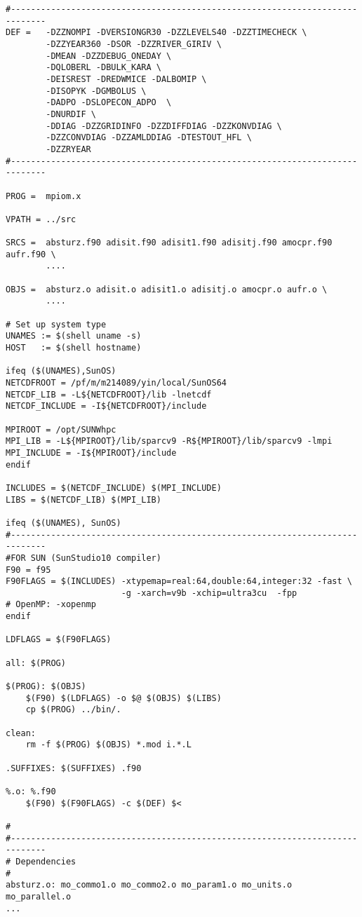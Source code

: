 \begin{footnotesize}
\begin{verbatim}
#-----------------------------------------------------------------------------
DEF =   -DZZNOMPI -DVERSIONGR30 -DZZLEVELS40 -DZZTIMECHECK \
        -DZZYEAR360 -DSOR -DZZRIVER_GIRIV \
        -DMEAN -DZZDEBUG_ONEDAY \
        -DQLOBERL -DBULK_KARA \
        -DEISREST -DREDWMICE -DALBOMIP \
        -DISOPYK -DGMBOLUS \
        -DADPO -DSLOPECON_ADPO  \
        -DNURDIF \
        -DDIAG -DZZGRIDINFO -DZZDIFFDIAG -DZZKONVDIAG \
        -DZZCONVDIAG -DZZAMLDDIAG -DTESTOUT_HFL \
        -DZZRYEAR
#-----------------------------------------------------------------------------

PROG =	mpiom.x

VPATH = ../src

SRCS =	absturz.f90 adisit.f90 adisit1.f90 adisitj.f90 amocpr.f90 aufr.f90 \
        ....

OBJS =	absturz.o adisit.o adisit1.o adisitj.o amocpr.o aufr.o \
        ....

# Set up system type
UNAMES := $(shell uname -s)
HOST   := $(shell hostname)

ifeq ($(UNAMES),SunOS)
NETCDFROOT = /pf/m/m214089/yin/local/SunOS64
NETCDF_LIB = -L${NETCDFROOT}/lib -lnetcdf
NETCDF_INCLUDE = -I${NETCDFROOT}/include

MPIROOT = /opt/SUNWhpc
MPI_LIB = -L${MPIROOT}/lib/sparcv9 -R${MPIROOT}/lib/sparcv9 -lmpi
MPI_INCLUDE = -I${MPIROOT}/include
endif

INCLUDES = $(NETCDF_INCLUDE) $(MPI_INCLUDE)
LIBS = $(NETCDF_LIB) $(MPI_LIB)

ifeq ($(UNAMES), SunOS)
#-----------------------------------------------------------------------------
#FOR SUN (SunStudio10 compiler)
F90 = f95
F90FLAGS = $(INCLUDES) -xtypemap=real:64,double:64,integer:32 -fast \
                       -g -xarch=v9b -xchip=ultra3cu  -fpp 
# OpenMP: -xopenmp
endif

LDFLAGS = $(F90FLAGS)

all: $(PROG)

$(PROG): $(OBJS)
	$(F90) $(LDFLAGS) -o $@ $(OBJS) $(LIBS)
	cp $(PROG) ../bin/.

clean:
	rm -f $(PROG) $(OBJS) *.mod i.*.L

.SUFFIXES: $(SUFFIXES) .f90

%.o: %.f90
	$(F90) $(F90FLAGS) -c $(DEF) $<	

#
#-----------------------------------------------------------------------------
# Dependencies
#
absturz.o: mo_commo1.o mo_commo2.o mo_param1.o mo_units.o mo_parallel.o
...
\end{verbatim}
\end{footnotesize}



